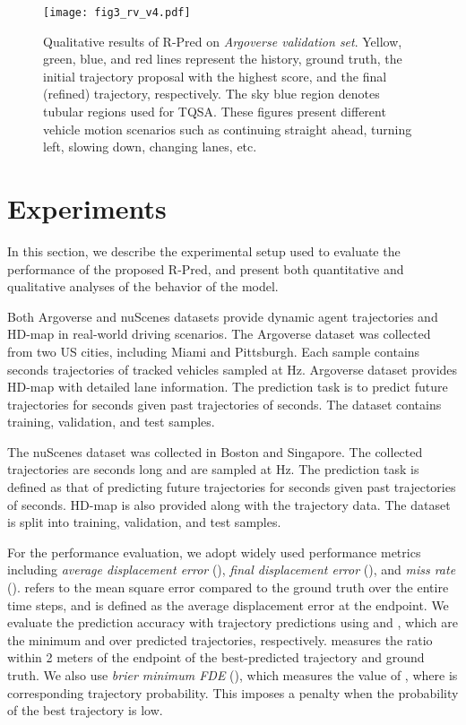 \documentclass[10pt,twocolumn,letterpaper]{article}
\begin{document}
\begin{figure*} [ht]
\centering  
\texttt{[image: fig3\_rv\_v4.pdf]}
\caption{Qualitative results of R-Pred on {\it Argoverse validation set}. Yellow, green, blue, and red lines represent the history, ground truth, the initial trajectory proposal with the highest score, and the final (refined) trajectory, respectively. The sky blue region denotes tubular regions used for TQSA. These figures present different vehicle motion scenarios such as continuing straight ahead, turning left, slowing down, changing lanes, etc.}
\label{qualitative}  
\end{figure*}

\section{Experiments}
In this section, we describe the experimental setup used to evaluate the performance of the proposed R-Pred, and present both quantitative and qualitative analyses of the behavior of the model.

 Both Argoverse \cite{Argoverse} and nuScenes \cite{nuScenes} datasets provide dynamic agent trajectories and HD-map in real-world driving scenarios. The Argoverse dataset was collected from two US cities, including Miami and Pittsburgh. Each sample contains  seconds trajectories of tracked vehicles sampled at  Hz. Argoverse dataset  provides HD-map with detailed lane information.  The prediction task is to predict future trajectories for  seconds given past trajectories of  seconds.  The dataset contains  training,  validation, and  test samples. 

The nuScenes dataset was collected in Boston and Singapore. The collected trajectories are  seconds long and are sampled at Hz.  The prediction task is defined as that of predicting future trajectories for  seconds given past trajectories of  seconds. HD-map is also provided along with the trajectory data. The dataset is split into  training,  validation, and  test samples.

 For the performance evaluation, we adopt widely used performance metrics including {\it average displacement error} (), {\it final displacement error} (), and {\it miss rate} ().  refers to the mean square error compared to the ground truth over the entire time steps, and  is defined as the average displacement error at the endpoint. We evaluate the prediction accuracy with  trajectory predictions using   and , which are the minimum  and  over  predicted trajectories, respectively.  measures the ratio within 2 meters of the endpoint of the best-predicted trajectory and ground truth. We also use {\it brier minimum FDE} (), which measures the value of , where  is corresponding trajectory probability. This imposes a penalty when the probability of the best trajectory is low. 
\end{document}
